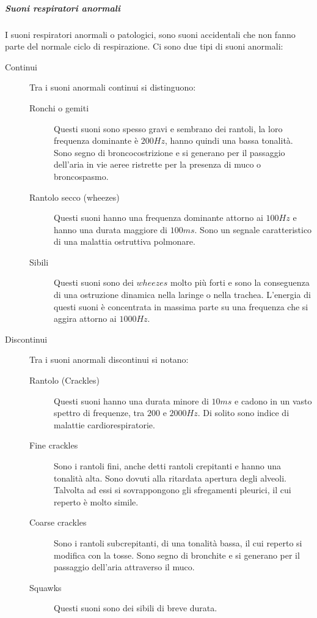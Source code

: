 \subparagraph{Suoni respiratori anormali}
    I suoni respiratori anormali o patologici, sono suoni accidentali che non fanno parte del normale ciclo di respirazione. 
    Ci sono due tipi di suoni anormali:
    \begin{description}
      \item[Continui]
	Tra i suoni anormali continui si distinguono: 
	\begin{description}
	  \item[Ronchi o gemiti]
	    Questi suoni sono spesso gravi e sembrano dei rantoli, la loro frequenza dominante \`e $200Hz$, hanno quindi una bassa tonalit\`a. 
	    Sono segno di broncocostrizione e si generano per il passaggio dell'aria in vie aeree ristrette per la presenza di muco o broncospasmo.
	  \item[Rantolo secco (wheezes)]
	    Questi suoni hanno una frequenza dominante attorno ai $100Hz$ e hanno una durata maggiore di $100ms$. 
	    Sono un segnale caratteristico di una malattia ostruttiva polmonare.
	  \item[Sibili]
	    Questi suoni sono dei $wheezes$ molto pi\`u forti e sono la conseguenza di una ostruzione dinamica nella laringe o nella trachea. 
	    L'energia di questi suoni \`e concentrata in massima parte su una frequenza che si aggira attorno ai $1000Hz$.
	\end{description}
      \item[Discontinui]
	Tra i suoni anormali discontinui si notano:
	\begin{description}
	  \item[Rantolo (Crackles)]
	    Questi suoni hanno una durata minore di $10ms$ e cadono in un vasto spettro di frequenze, tra $200$ e $2000Hz$. Di solito sono indice di malattie cardiorespiratorie.
	  \item[Fine  crackles]
	    Sono i rantoli fini, anche detti rantoli crepitanti e hanno una tonalit\`a alta. Sono dovuti alla ritardata apertura degli alveoli. Talvolta ad essi si sovrappongono gli sfregamenti pleurici, il cui reperto \`e molto simile.
	  \item[Coarse crackles]
	    Sono i rantoli subcrepitanti, di una tonalit\`a bassa, il cui reperto si modifica con la tosse. Sono segno di bronchite e si generano per il passaggio dell'aria attraverso il muco.
	  \item[Squawks]
	    Questi suoni sono dei sibili di breve durata.
	\end{description}
    \end{description}


